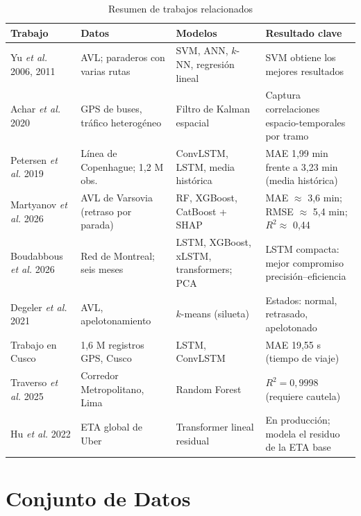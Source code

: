 \documentclass[conference,spanish]{IEEEtran}
\begin{document}
\begin{table}[t]
\centering
\caption{Resumen de trabajos relacionados}
\label{tab:sota}
\footnotesize
\begin{tabular}{@{}p{3.4cm}p{4.3cm}p{4.0cm}p{4.9cm}@{}}
\toprule
\textbf{Trabajo} & \textbf{Datos} & \textbf{Modelos} & \textbf{Resultado clave}\\
\midrule
Yu \textit{et al.} 2006, 2011 \cite{yu2006,yu2011} & AVL; paraderos con varias rutas & SVM, ANN, $k$-NN, regresión lineal & SVM obtiene los mejores resultados\\
Achar \textit{et al.} 2020 \cite{achar2020} & GPS de buses, tráfico heterogéneo & Filtro de Kalman espacial & Captura correlaciones espacio-temporales por tramo\\
Petersen \textit{et al.} 2019 \cite{petersen2019} & Línea de Copenhague; 1,2 M obs. & ConvLSTM, LSTM, media histórica & MAE 1,99 min frente a 3,23 min (media histórica)\\
Martyanov \textit{et al.} 2026 \cite{martyanov2026} & AVL de Varsovia (retraso por parada) & RF, XGBoost, CatBoost + SHAP & MAE $\approx$ 3,6 min; RMSE $\approx$ 5,4 min; $R^2\approx$ 0,44\\
Boudabbous \textit{et al.} 2026 \cite{boudabbous2026} & Red de Montreal; seis meses & LSTM, XGBoost, xLSTM, transformers; PCA & LSTM compacta: mejor compromiso precisión--eficiencia\\
Degeler \textit{et al.} 2021 \cite{degeler2021} & AVL, apelotonamiento & $k$-means (silueta) & Estados: normal, retrasado, apelotonado\\
Trabajo en Cusco \cite{cusco2024} & 1,6 M registros GPS, Cusco & LSTM, ConvLSTM & MAE 19,55 s (tiempo de viaje)\\
Traverso \textit{et al.} 2025 \cite{traverso2025} & Corredor Metropolitano, Lima & Random Forest & $R^2=0{,}9998$ (requiere cautela)\\
Hu \textit{et al.} 2022 \cite{hu2022deepreta} & ETA global de Uber & Transformer lineal residual & En producción; modela el residuo de la ETA base\\
\bottomrule
\end{tabular}
\end{table}

\section{Conjunto de Datos}
\end{document}

